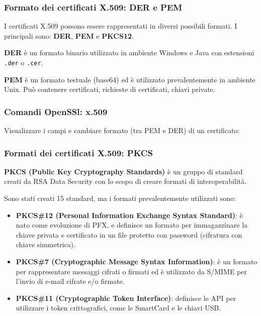             

        \subsubsection{Formato dei certificati X.509: DER e PEM}
            I certificati X.509 possono essere rappresentati in diversi possibili formati. I principali sono: \textbf{DER}, \textbf{PEM} e \textbf{PKCS12}.
        
            \textbf{DER} è un formato binario utilizzato in ambiente Windows e Java con estensioni \verb|.der| o \verb|.cer|.
        
            \textbf{PEM} è un formato testuale (base64) ed è utilizzato prevalentemente in ambiente Unix. Può contenere certificati, richieste di certificati, chiavi private.

        \subsubsection{Comandi OpenSSl: x.509}
            Visualizzare i campi e cambiare formato (tra PEM e DER) di un certificato:

            

        \subsubsection{Formati dei certificati X.509: PKCS}
            \textbf{PKCS (Public Key Cryptography Standards)} è un gruppo di standard creati da RSA Data Security con lo scopo di creare formati di interoperabilità.

            Sono stati creati 15 standard, ma i formati prevalentemente utilizzati sono:
            \begin{itemize}
                \item \textbf{PKCS\#12 (Personal Information Exchange Syntax Standard)}: è nato come evoluzione di PFX, e definisce un formato per immagazzinare la chiave privata e certificato in un file protetto con password (cifratura con chiave simmetrica).
                \item \textbf{PKCS\#7 (Cryptographic Message Syntax Information)}: è un formato per rappresentare messaggi cifrati o firmati ed è utilizzato da S/MIME per l'invio di e-mail cifrate e/o firmate.
                \item \textbf{PKCS\#11 (Cryptographic Token Interface)}: definisce le API per utilizzare i token crittografici, come le SmartCard e le chiavi USB.
            \end{itemize}

